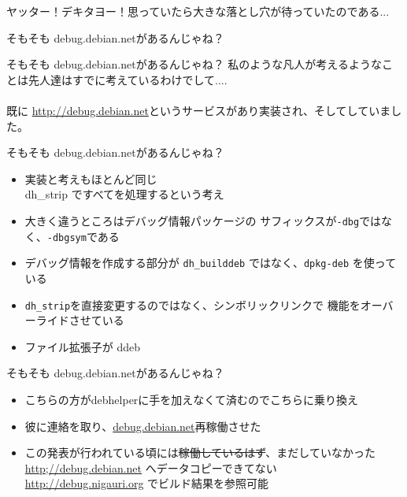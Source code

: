 
\begin{frame}
ヤッター！デキタヨー！思っていたら大きな落とし穴が待っていたのである...
\end{frame}

\begin{frame}
\Huge{そもそも debug.debian.netがあるんじゃね？}
\end{frame}

\begin{frame}{そもそも debug.debian.netがあるんじゃね？}
私のような凡人が考えるようなことは先人達はすでに考えているわけでして....\\
\pause
　\\
既に \url{http://debug.debian.net}というサービスがあり実装され、そして\color{red}{終了}していました。

\end{frame}

\begin{frame}{そもそも debug.debian.netがあるんじゃね？}
\begin{itemize}[<+->]
\item 実装と考えもほとんど同じ\\
	dh\_strip ですべてを処理するという考え
\item 大きく違うところはデバッグ情報パッケージの
サフィックスが\texttt{-dbg}ではなく、\texttt{-dbgsym}である
\item デバッグ情報を作成する部分が \texttt{dh\_builddeb} ではなく、\texttt{dpkg-deb} を使っている
\item \texttt{dh\_strip}を直接変更するのではなく、シンボリックリンクで
機能をオーバーライドさせている
\item ファイル拡張子が ddeb
\end{itemize}
\end{frame}

\begin{frame}{そもそも debug.debian.netがあるんじゃね？}
\begin{itemize}[<+->]
\item こちらの方がdebhelperに手を加えなくて済むのでこちらに乗り換え
\item 彼に連絡を取り、\url{debug.debian.net}再稼働させた
\item この発表が行われている頃には\sout{稼働しているはず}、まだしていなかった\\
  \url{http;//debug.debian.net} へデータコピーできてない\\
  \url{http://debug.nigauri.org} でビルド結果を参照可能
\end{itemize}
\end{frame}

